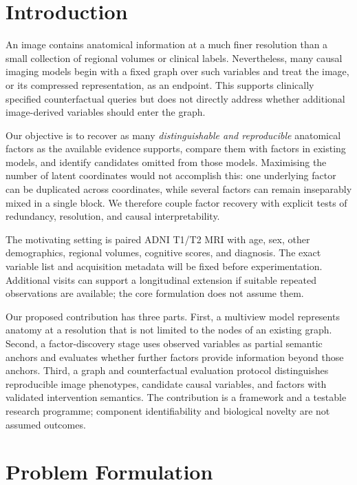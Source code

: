 \documentclass[10pt,twocolumn,letterpaper]{article}
\begin{document}
\section{Introduction}

An image contains anatomical information at a much finer resolution than a small collection of regional volumes or clinical labels. Nevertheless, many causal imaging models begin with a fixed graph over such variables and treat the image, or its compressed representation, as an endpoint. This supports clinically specified counterfactual queries but does not directly address whether additional image-derived variables should enter the graph.

Our objective is to recover as many \emph{distinguishable and reproducible} anatomical factors as the available evidence supports, compare them with factors in existing models, and identify candidates omitted from those models. Maximising the number of latent coordinates would not accomplish this: one underlying factor can be duplicated across coordinates, while several factors can remain inseparably mixed in a single block. We therefore couple factor recovery with explicit tests of redundancy, resolution, and causal interpretability.

The motivating setting is paired ADNI T1/T2 MRI with age, sex, other demographics, regional volumes, cognitive scores, and diagnosis. The exact variable list and acquisition metadata will be fixed before experimentation. Additional visits can support a longitudinal extension if suitable repeated observations are available; the core formulation does not assume them.

Our proposed contribution has three parts. First, a multiview model represents anatomy at a resolution that is not limited to the nodes of an existing graph. Second, a factor-discovery stage uses observed variables as partial semantic anchors and evaluates whether further factors provide information beyond those anchors. Third, a graph and counterfactual evaluation protocol distinguishes reproducible image phenotypes, candidate causal variables, and factors with validated intervention semantics. The contribution is a framework and a testable research programme; component identifiability and biological novelty are not assumed outcomes.

\section{Problem Formulation}
\label{sec:problem}
\end{document}
